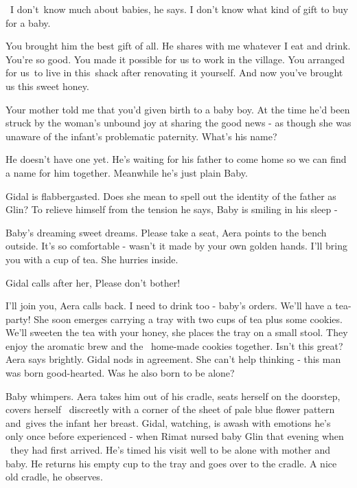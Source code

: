 \documentclass[12pt]{book}
\begin{document}
\ {\textquotedbl}I don't~know much about babies,{\textquotedbl} he says. {\textquotedbl}I don't know what kind of gift
to buy for a baby.{\textquotedbl}

{\textquotedbl}You brought him the best gift of all. He shares with me whatever I eat and drink. You're so good. You
made it possible{ }for us to work in the village. You arranged for us~to live
in this~shack after renovating it yourself. And now you've brought us this sweet honey.{\textquotedbl}

{\textquotedbl}Your mother told me that you'd given{ }birth to a baby
boy.{\textquotedbl} At the time he'd been struck by the woman's unbound joy at sharing the good news - as though she
was unaware of the infant's{ }problematic paternity. {\textquotedbl}What's his name?{\textquotedbl}

{\textquotedbl}He doesn't have one yet. He's waiting for his father to come home so we can find a name for him together.
Meanwhile he's just plain Baby.{\textquotedbl}

Gidal is flabbergasted. Does she mean to spell out the identity of the father as Glin? To relieve himself from the
tension he says, {\textquotedbl}Baby is smiling in his sleep -{\textquotedbl} ~

{\textquotedbl}Baby's dreaming sweet dreams. Please take a seat,{\textquotedbl} Aera points to the bench
outside{.} {\textquotedbl}It's so comfortable - wasn't it made by your own
golden hands. I'll bring you with a cup of tea.{\textquotedbl} She hurries inside.

Gidal calls after her, {\textquotedbl}Please don't bother!{\textquotedbl}


\bigskip

{\textquotedbl}I'll join you,{\textquotedbl} Aera calls back. {\textquotedbl}I need to drink too - baby's orders. We'll
have a tea-party!{\textquotedbl} She soon emerges carrying a tray with two cups of tea plus some cookies.
{\textquotedbl}We'll sweeten the tea with your honey,{\textquotedbl}{ }she
places the tray on a small stool. They enjoy the aromatic brew and the \ home-made cookies together.
{\textquotedbl}Isn't this great?{\textquotedbl} Aera says brightly. Gidal nods in agreement. She can't help thinking -
this man was born good-hearted. Was he also born to be alone?

Baby whimpers. Aera takes him out of his cradle, seats herself on the doorstep, covers herself
{\ }discreetly{ }with a corner of the
sheet of pale blue flower pattern and~gives the infant her breast. Gidal, watching, is awash with
emotions{ }he's only once before experienced - when Rimat nursed baby Glin that evening when \ they had
first arrived. He's timed his visit well to be alone with mother and baby. He returns his empty cup to the tray and
goes over to the cradle. {\textquotedbl}A nice old cradle,{\textquotedbl} he
observes{.}
\end{document}

